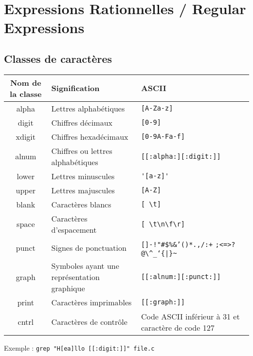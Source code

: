 \documentclass[11pt,a4paper]{article}
\author{Fabrice BOISSIER}
\begin{document}
\section{Expressions Rationnelles / Regular Expressions}

\bigskip

\subsection{Classes de caractères}

\bigskip


\begin{center}
	\begin{tabular}{ c | M{4cm} | M{7cm} }
  \textbf{Nom de la classe} & \textbf{Signification} & \textbf{ASCII} \\  \hline
	alpha & Lettres alphabétiques & \verb![A-Za-z]! \\ \hline
	digit & Chiffres décimaux & \verb![0-9]! \\ \hline
	xdigit & Chiffres hexadécimaux & \verb![0-9A-Fa-f]! \\ \hline
	alnum & Chiffres ou lettres alphabétiques & \verb![[:alpha:][:digit:]]! \\ \hline
	lower & Lettres minuscules & \verb!'[a-z]'! \\ \hline
	upper & Lettres majuscules & \verb![A-Z]! \\ \hline
	blank & Caractères blancs & \verb![ \t]! \\ \hline
	space & Caractères d'espacement & \verb![ \t\n\f\r]! \\ \hline
	punct & Signes de ponctuation & \verb|[]-!"#$%&’()*.,/:+| \verb!;<=>?@\^_‘{|}~! \\ \hline
	graph & Symboles ayant une représentation graphique & \verb![[:alnum:][:punct:]]! \\ \hline
	print & Caractères imprimables & \verb![[:graph:]]! \\ \hline
	cntrl & Caractères de contrôle & Code ASCII inférieur à 31 et caractère de code 127 \\
	\end{tabular}
\end{center}


\bigskip

\noindent Exemple : \verb!grep "H[ea]llo [[:digit:]]" file.c!

\newpage
\end{document}
